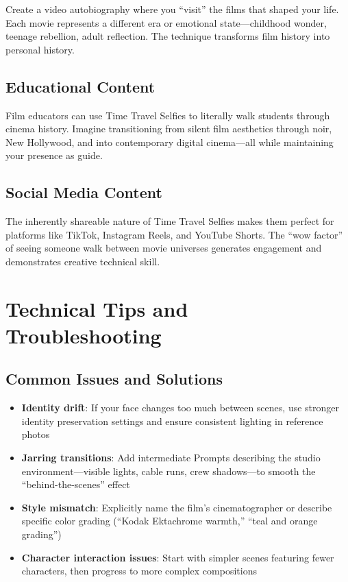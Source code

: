 Create a video autobiography where you ``visit'' the films that shaped your life. Each movie represents a different era or emotional state—childhood wonder, teenage rebellion, adult reflection. The technique transforms film history into personal history.

\subsection{Educational Content}

Film educators can use Time Travel Selfies to literally walk students through cinema history. Imagine transitioning from silent film aesthetics through noir, New Hollywood, and into contemporary digital cinema—all while maintaining your presence as guide.

\subsection{Social Media Content}

The inherently shareable nature of Time Travel Selfies makes them perfect for platforms like TikTok, Instagram Reels, and YouTube Shorts. The ``wow factor'' of seeing someone walk between movie universes generates engagement and demonstrates creative technical skill.

\section{Technical Tips and Troubleshooting}
\label{sec:tips-troubleshooting}

\subsection{Common Issues and Solutions}

\begin{itemize}
\item \textbf{Identity drift}: If your face changes too much between scenes, use stronger identity preservation settings and ensure consistent lighting in reference photos

\item \textbf{Jarring transitions}: Add intermediate Prompts describing the studio environment—visible lights, cable runs, crew shadows—to smooth the ``behind-the-scenes'' effect

\item \textbf{Style mismatch}: Explicitly name the film's cinematographer or describe specific color grading (``Kodak Ektachrome warmth,'' ``teal and orange grading'')

\item \textbf{Character interaction issues}: Start with simpler scenes featuring fewer characters, then progress to more complex compositions
\end{itemize}

